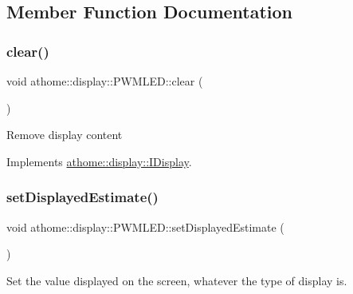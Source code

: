 \subsection{Member Function Documentation}
\mbox{\label{classathome_1_1display_1_1_p_w_m_l_e_d_ad13265bec1900a48d3d89aac9a532783}} 
\subsubsection{\texorpdfstring{clear()}{clear()}}
{\footnotesize\ttfamily void athome\+::display\+::\+P\+W\+M\+L\+E\+D\+::clear (\begin{DoxyParamCaption}{ }\end{DoxyParamCaption})\hspace{0.3cm}{\ttfamily [virtual]}}

Remove display content 

Implements \mbox{\hyperlink{classathome_1_1display_1_1_i_display_a0d3add1ce61c96657827fb56d250d9c6}{athome\+::display\+::\+I\+Display}}.

\mbox{\label{classathome_1_1display_1_1_p_w_m_l_e_d_a8cde32d9aa5b28dfbc79e2677bfce921}} 
\subsubsection{\texorpdfstring{set\+Displayed\+Estimate()}{setDisplayedEstimate()}}
{\footnotesize\ttfamily void athome\+::display\+::\+P\+W\+M\+L\+E\+D\+::set\+Displayed\+Estimate (\begin{DoxyParamCaption}\item[{\mbox{\hyperlink{classathome_1_1sensor_1_1_i_sensor_aa70bc27a4c17c86caf96cca776541ddf}{sensor\+::\+I\+Sensor\+::\+I\+Sensor\+Scale}}}]{ }\end{DoxyParamCaption})\hspace{0.3cm}{\ttfamily [virtual]}}

Set the value displayed on the screen, whatever the type of display is.

